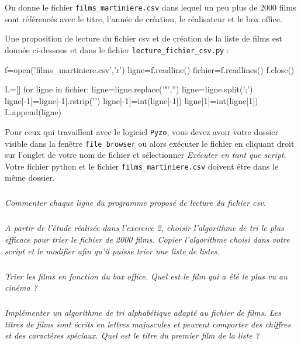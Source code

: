 On donne le fichier \texttt{films\_martiniere.csv} dans lequel un peu plus de 2000 films sont référencés avec le titre, l'année de création, le réalisateur et le box office.

Une proposition de lecture du fichier csv et de création de la liste de films est donnée ci-dessous et dans le fichier \texttt{lecture\_fichier\_csv.py} :

\begin{python}
f=open('films_martiniere.csv','r')
ligne=f.readline()
fichier=f.readlines()
f.close()

L=[]
for ligne in fichier:
    ligne=ligne.replace('"','')
    ligne=ligne.split(';')
    ligne[-1]=ligne[-1].rstrip('\n')
    ligne[-1]=int(ligne[-1])
    ligne[1]=int(ligne[1])
    L.append(ligne)
\end{python}

Pour ceux qui travaillent avec le logiciel \texttt{Pyzo}, vous devez avoir votre dossier visible dans la fenêtre \texttt{file browser} ou alors exécuter le fichier en cliquant droit sur l'onglet de votre nom de fichier et sélectionner \textit{Exécuter en tant que script}. Votre fichier python et le fichier \texttt{films\_martiniere.csv} doivent être dans le même dossier.

\subparagraph{}
\textit{Commenter chaque ligne du programme proposé de lecture du fichier csv. %
}

\subparagraph{}
\textit{A partir de l'étude réalisée dans l'exercice 2, choisir l'algorithme de tri le plus efficace pour trier le 
fichier de 2000 films. Copier l'algorithme choisi dans votre script et le modifier afin qu'il puisse trier une liste 
de listes.}

\subparagraph{}
\textit{Trier les films en fonction du box office. Quel est le film qui a été le plus vu au cinéma ?}


\subparagraph{}
\textit{Implémenter un algorithme de tri alphabétique adapté au fichier de films. Les titres de films sont écrits en 
lettres majuscules et peuvent comporter des chiffres et des caractères spéciaux. Quel est le titre du premier film de 
la liste ?}


